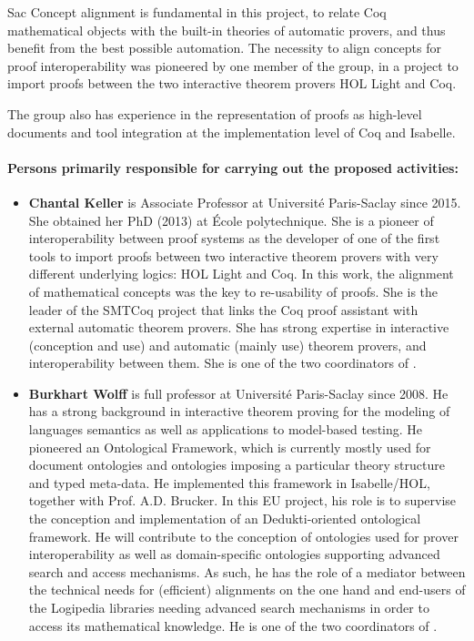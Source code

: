 \begin{sitedescription}{Sac}
Concept alignment is fundamental in this project, to relate Coq
mathematical objects with the built-in theories of automatic provers,
and thus benefit from the best possible automation. The necessity to
align concepts for proof interoperability was pioneered by one member of
the group, in a project to import proofs between the two interactive
theorem provers HOL Light and Coq.

The group also has experience in the representation of proofs as
high-level documents and tool integration at the implementation level
of Coq and Isabelle. 

\paragraph*{Persons primarily responsible for carrying out the proposed
  activities:}

\begin{itemize} %

\item {\bf Chantal Keller} is Associate Professor at Université
  Paris-Saclay since 2015. She obtained her PhD (2013) at École
  polytechnique. She is a pioneer of interoperability between proof
  systems as the developer of one of the first tools to import proofs
  between two interactive theorem provers with very different underlying
  logics: HOL Light and Coq. In this work, the alignment of mathematical
  concepts was the key to re-usability of proofs. She is the leader of
  the SMTCoq project that links the Coq proof assistant with external
  automatic theorem provers. She has strong expertise in interactive
  (conception and use) and automatic (mainly use) theorem provers, and
  interoperability between them. She is one of the two coordinators of
  .

\item {\bf Burkhart Wolff} is full professor at Université
  Paris-Saclay since 2008. He has a strong background in interactive
  theorem proving for the modeling of languages semantics as well as
  applications to model-based testing. He pioneered an Ontological
  Framework, which is currently mostly used for document ontologies and
  ontologies imposing a particular theory structure and typed meta-data.
  He implemented this framework in Isabelle/HOL, together with Prof.
  A.D. Brucker. In this EU project, his role is to supervise the
  conception and implementation of an Dedukti-oriented ontological
  framework. He will contribute to the conception of ontologies used for
  prover interoperability as well as domain-specific ontologies
  supporting advanced search and access mechanisms. As such, he has the
  role of a mediator between the technical needs for (efficient)
  alignments on the one hand and end-users of the Logipedia libraries
  needing advanced search mechanisms in order to access its mathematical
  knowledge. He is one of the two coordinators of .

\end{itemize}

\end{sitedescription}


